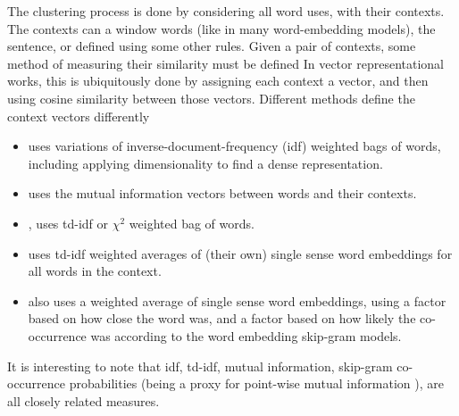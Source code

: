 \documentclass[12pt,parskip]{komatufte}
\begin{document}
The clustering process is done by considering all word uses, with their contexts.
The contexts can a window words (like in many word-embedding models), the sentence, or defined using some other rules.
Given a pair of contexts, some method of measuring their similarity must be defined
In vector representational works, this is ubiquitously done by assigning each context a vector, and then using cosine similarity between those vectors.
Different methods define the context vectors differently
\begin{itemize}
\item \textcite{Schutze:1998wordsenseclustering} uses variations of inverse-document-frequency (idf) weighted bags of words, including applying dimensionality to find a dense representation.
\item \textcite{pantel2002WSI} uses the mutual information vectors between words and their contexts.
\item \textcite{Reisinger2010}, uses td-idf or $\chi^2$ weighted bag of words.
\item {} uses td-idf weighted averages of (their own) single sense word embeddings for all words in the context.
\item  {} also uses a weighted average of single sense word embeddings, using a factor based on how close the word was, and a factor based on how likely the co-occurrence was according to the word embedding skip-gram models.

\end{itemize}
It is interesting to note that idf, td-idf, mutual information, skip-gram co-occurrence probabilities (being a proxy for point-wise mutual information \parencite{levy2014neural}), are all closely related measures.
\end{document}

